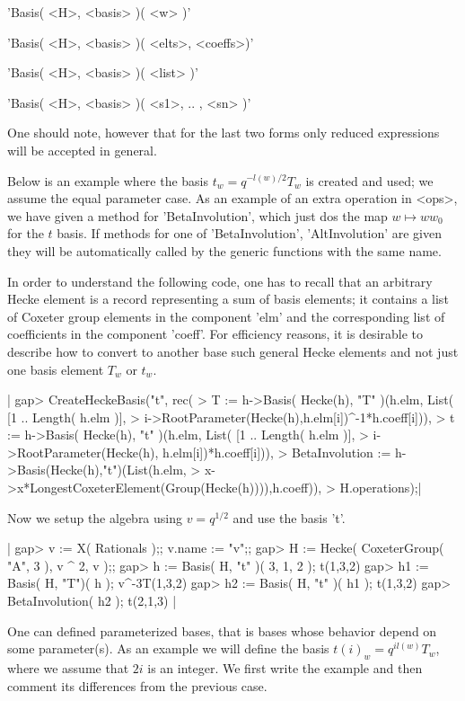 'Basis( <H>, <basis> )( <w> )'

'Basis( <H>, <basis> )( <elts>, <coeffs>)'

'Basis( <H>, <basis> )( <list> )'

'Basis( <H>, <basis> )( <s1>, .. , <sn> )'

One   should note,  however  that  for the  last  two forms  only reduced
expressions will be accepted in general.

Below  is an  example where  the basis  $t_w=q^{-l(w)/2}T_w$ is created and
used;  we  assume  the  equal  parameter  case.  As  an example of an extra
operation in <ops>, we have given a method for 'BetaInvolution', which just
dos  the map  $w\mapsto w  w_0$ for  the $t$  basis. If  methods for one of
'BetaInvolution',  'AltInvolution'  are  given  they  will be automatically
called by the generic functions with the same name.

In  order  to  understand  the  following  code,  one has to recall that an
arbitrary  Hecke element is a record  representing a sum of basis elements;
it contains a list of Coxeter group elements in the component 'elm' and the
corresponding list of coefficients in the component 'coeff'. For efficiency
reasons,  it is desirable to  describe how to convert  to another base such
general Hecke elements and not just one basis element $T_w$ or $t_w$.

|    gap> CreateHeckeBasis("t", rec(
    >   T := h->Basis( Hecke(h), "T" )(h.elm, List( [1 .. Length( h.elm )],
    >      i->RootParameter(Hecke(h),h.elm[i])^-1*h.coeff[i])),
    >   t := h->Basis( Hecke(h), "t" )(h.elm, List( [1 .. Length( h.elm )],
    >      i->RootParameter(Hecke(h), h.elm[i])*h.coeff[i])),
    >   BetaInvolution := h->Basis(Hecke(h),"t")(List(h.elm,
    >    x->x*LongestCoxeterElement(Group(Hecke(h)))),h.coeff)),
    >    H.operations);|

Now we setup the algebra using $v=q^{1/2}$ and use the basis 't'.

|    gap> v := X( Rationals );; v.name := "v";;
    gap> H := Hecke( CoxeterGroup( "A", 3 ), v ^ 2, v );;
    gap> h := Basis( H, "t" )( 3, 1, 2 );
    t(1,3,2)
    gap> h1 := Basis( H, "T")( h );
    v^-3T(1,3,2)
    gap> h2 := Basis( H, "t" )( h1 );
    t(1,3,2)
    gap> BetaInvolution( h2 );
    t(2,1,3) |


One can defined parameterized bases, that is bases whose behavior depend on
some  parameter(s). As  an example  we will  define the  basis $t(i)_w=q^{i
l(w)}T_w$,  where we  assume that  $2i$ is  an integer.  We first write the
example and then comment its differences from the previous case.

